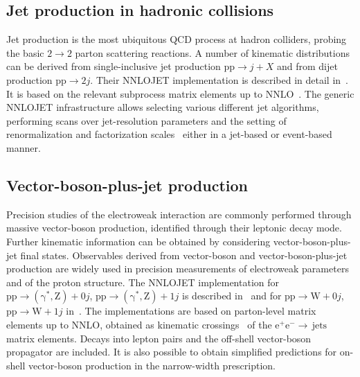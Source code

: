 \documentclass{SciPost}
\DeclareRobustCommand{\ensuremathrm}[1]{\ensuremath{\mathrm{#1}}}
\DeclareRobustCommand{\jets}{{\mathrm{jets}}\xspace}
\DeclareRobustCommand{\PZ}{{\ensuremathrm{Z}}\xspace}
\DeclareRobustCommand{\PW}{{\ensuremathrm{W}}\xspace}
\DeclareRobustCommand{\Pgg}{{\ensuremathrm{\gamma}}\xspace}
\DeclareRobustCommand{\Pep}{{\ensuremathrm{e^+}}\xspace}
\DeclareRobustCommand{\Pem}{{\ensuremathrm{e^-}}\xspace}
\DeclareRobustCommand{\Pp}{{\ensuremathrm{p}}\xspace}
\begin{document}
\subsection{Jet production in hadronic collisions}
Jet production is the most ubiquitous QCD process at hadron colliders, probing the basic
 $2\to 2$ parton scattering reactions. A number of kinematic distributions can be derived from single-inclusive jet production
$\Pp\Pp \to j+X$ and from dijet production
$\Pp\Pp\to 2j$. Their NNLOJET implementation is described
in detail in~\cite{NigelGlover:2010kwr,Gehrmann-DeRidder:2011jwo,Gehrmann-DeRidder:2012dog,Currie:2016bfm,Currie:2017eqf,Gehrmann-DeRidder:2019ibf,Chen:2022tpk,Chen:2022clm}. It is based on the relevant subprocess matrix elements up to NNLO~\cite{Berends:1987me,Mangano:1990by,Kuijf:thesis,Bern:1993mq,Bern:1994fz,Kunszt:1994nq,Signer:thesis,Anastasiou:2001sv,Glover:2001af,Glover:2001rd,Anastasiou:2000kg,Anastasiou:2000ue,Anastasiou:2000mv}.
The generic NNLOJET
infrastructure allows selecting various different jet algorithms, performing scans over jet-resolution parameters and the setting of renormalization and factorization scales~\cite{Currie:2018xkj}
either in a jet-based or event-based manner.

\subsection{Vector-boson-plus-jet production}
Precision studies of the electroweak interaction are commonly performed through massive vector-boson production, identified through their leptonic decay mode. Further
kinematic information can be obtained by considering vector-boson-plus-jet final states. Observables derived from vector-boson and vector-boson-plus-jet
production are widely used in precision measurements of electroweak parameters and of the proton structure. The NNLOJET implementation for
$\Pp\Pp \to (\Pgg^*,\PZ)+0j$, $\Pp\Pp\to (\Pgg^*,\PZ)+1j$ is described in~\cite{Gehrmann-DeRidder:2015wbt,Gehrmann-DeRidder:2016cdi,Gehrmann-DeRidder:2016jns,Gauld:2017tww,Gehrmann-DeRidder:2019avi,Gauld:2021pkr,Gehrmann-DeRidder:2023urf} and for $\Pp\Pp\to \PW+0j$, $\Pp\Pp\to \PW+1j$ in~\cite{Gehrmann-DeRidder:2017mvr,Gehrmann-DeRidder:2019avi}. The implementations are based on parton-level matrix elements up to NNLO, obtained as kinematic
crossings~\cite{Gehrmann:2011ab} of the $\Pep\Pem\to\,\jets$ matrix elements.
Decays into lepton pairs and the off-shell vector-boson propagator are included. It is also possible to
obtain simplified predictions for on-shell vector-boson production in the narrow-width prescription.
\end{document}
